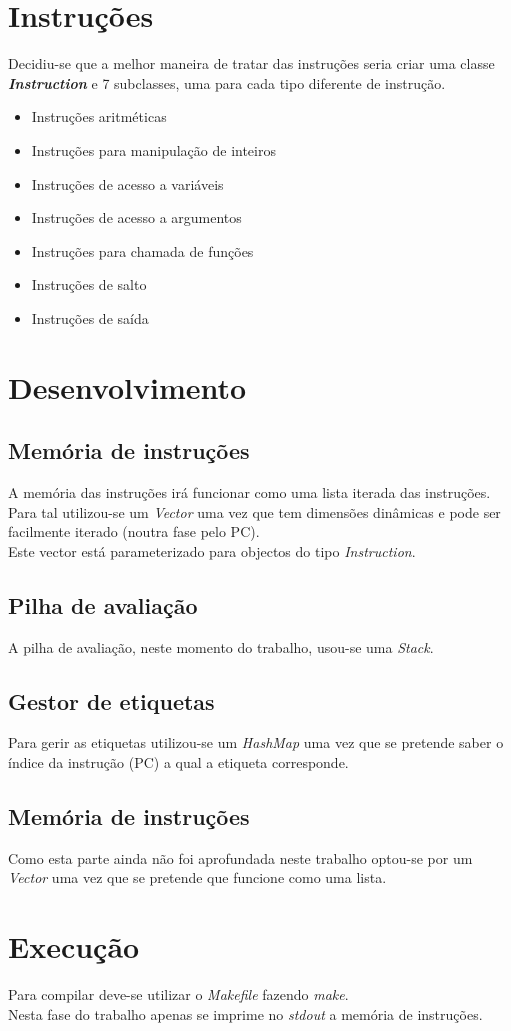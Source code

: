 \documentclass[a4paper,12pt,headings=small]{article}
\begin{document}
\section{Instruções}
Decidiu-se que a melhor maneira de tratar das instruções seria criar uma classe \textit{\textbf{Instruction}} e 7 subclasses, uma para cada tipo diferente de instrução.\\

\begin{itemize}
\item Instruções aritméticas
\item Instruções para manipulação de inteiros
\item Instruções de acesso a variáveis
\item Instruções de acesso a argumentos
\item Instruções para chamada de funções
\item Instruções de salto
\item Instruções de saída
\end{itemize}

\section{Desenvolvimento}

\subsection{Memória de instruções}
\FloatBarrier
A memória das instruções irá funcionar como uma lista iterada das instruções. Para tal utilizou-se um \textit{Vector} uma vez que tem dimensões dinâmicas e pode ser facilmente iterado (noutra fase pelo PC).\\
Este vector está parameterizado para objectos do tipo \textit{Instruction}.

\subsection{Pilha de avaliação}
\FloatBarrier
A pilha de avaliação, neste momento do trabalho, usou-se uma \textit{Stack}.

\subsection{Gestor de etiquetas}
\FloatBarrier
Para gerir as etiquetas utilizou-se um \textit{HashMap} uma vez que se pretende saber o índice da instrução (PC) a qual a etiqueta corresponde.

\subsection{Memória de instruções}
\FloatBarrier
Como esta parte ainda não foi aprofundada neste trabalho optou-se por um \textit{Vector} uma vez que se pretende que funcione como uma lista.

\section{Execução}
Para compilar deve-se utilizar o \textit{Makefile} fazendo \textit{make}.\\
Nesta fase do trabalho apenas se imprime no \textit{stdout} a memória de instruções.
\end{document}
